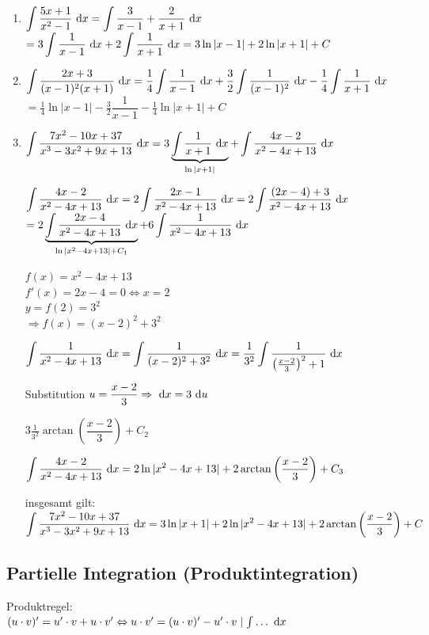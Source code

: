 \Bsp
\begin{enumerate}
	\item $\displaystyle\int\dfrac{5x+1}{x^2-1}\ \mathrm{d}x=\displaystyle\int\dfrac{3}{x-1}+\dfrac{2}{x+1}\ \mathrm{d}x$\\
	$=3\displaystyle\int\dfrac{1}{x-1}\ \mathrm{d}x+2\displaystyle\int\dfrac{1}{x+1}\ \mathrm{d}x=3\ln|x-1|+2\ln|x+1|+C$
	
	\item $\displaystyle\int\dfrac{2x+3}{(x-1)^2(x+1)}\ \mathrm{d}x=\frac{1}{4}\displaystyle\int\dfrac{1}{x-1}\ \mathrm{d}x+\frac{3}{2}\displaystyle\int\dfrac{1}{(x-1)^2}\ \mathrm{d}x-\frac{1}{4}\displaystyle\int\dfrac{1}{x+1}\ \mathrm{d}x$\\
	$=\frac{1}{4}\ln|x-1|-\frac{3}{2}\dfrac{1}{x-1}-\frac{1}{4}\ln|x+1|+C$
	
	\item $\displaystyle\int\dfrac{7x^2-10x+37}{x^3-3x^2+9x+13}\ \mathrm{d}x=3\underbrace{\displaystyle\int\dfrac{1}{x+1}\ \mathrm{d}x}_{\ln|x+1|}+\displaystyle\int\dfrac{4x-2}{x^2-4x+13}\ \mathrm{d}x$
	
	$\displaystyle\int\dfrac{4x-2}{x^2-4x+13}\ \mathrm{d}x=2\displaystyle\int\dfrac{2x-1}{x^2-4x+13}\ \mathrm{d}x=2\displaystyle\int\dfrac{(2x-4)+3}{x^2-4x+13}\ \mathrm{d}x$\\
	$=2\underbrace{\displaystyle\int\dfrac{2x-4}{x^2-4x+13}\ \mathrm{d}x}_{\ln|x^2-4x+13|+C_1}+6\displaystyle\int\dfrac{1}{x^2-4x+13}\ \mathrm{d}x$
	
	$f(x)=x^2-4x+13$\\
	$f'(x)=2x-4=0\Leftrightarrow x=2$\\
	$y=f(2)=3^2$\\
	$\Rightarrow f(x)=(x-2)^2+3^2$
	
	$\displaystyle\int\dfrac{1}{x^2-4x+13}\ \mathrm{d}x=\displaystyle\int\dfrac{1}{(x-2)^2+3^2}\ \mathrm{d}x=\frac{1}{3^2}\displaystyle\int\dfrac{1}{\left(\frac{x-2}{3}\right)^2+1}\ \mathrm{d}x$
	
	Substitution $u=\dfrac{x-2}{3}\Rightarrow\ \mathrm{d}x=3\ \mathrm{d}u$
	
	$3\frac{1}{3^2}\arctan\left(\dfrac{x-2}{3}\right)+C_2$
	
	$\displaystyle\int\dfrac{4x-2}{x^2-4x+13}\ \mathrm{d}x=2\ln|x^2-4x+13|+2\arctan\left(\dfrac{x-2}{3}\right)+C_3$
	
	insgesamt gilt:\\
	$\displaystyle\int\dfrac{7x^2-10x+37}{x^3-3x^2+9x+13}\ \mathrm{d}x=3\ln|x+1|+2\ln|x^2-4x+13|+2\arctan\left(\dfrac{x-2}{3}\right)+C$
\end{enumerate}

\clearpage
\subsection{Partielle Integration (Produktintegration)}
Produktregel:\\
$(u\cdot v)'=u'\cdot v + u\cdot v'\\
\Leftrightarrow u\cdot v'=(u\cdot v)'-u'\cdot v\mid\int\ldots\ \mathrm{d}x$\\

